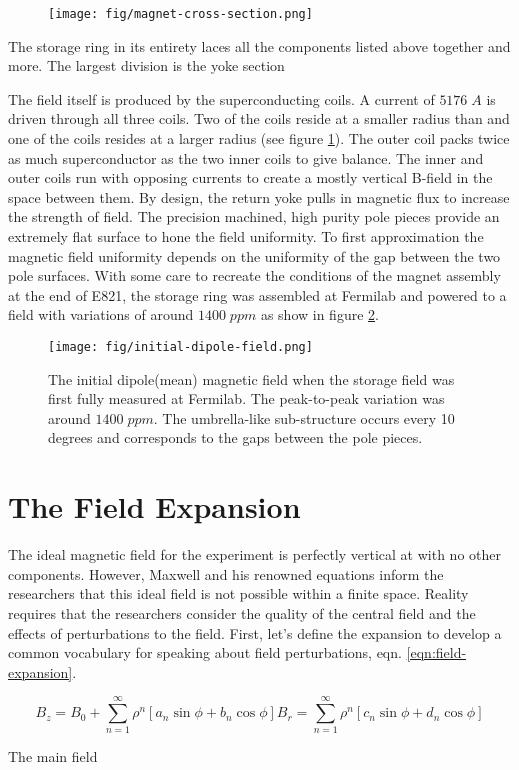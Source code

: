 \begin{figure}
\texttt{[image: fig/magnet-cross-section.png]}
\caption{}
\label{fig:magnet-cross-section}
\end{figure}

The storage ring in its entirety laces all the components listed above together and more.  The largest division is the yoke section

The field itself is produced by the superconducting coils.  A current of $5176\;A$ is driven through all three coils.  Two of the coils reside at a smaller radius than \rmagic and one of the coils resides at a larger radius (see figure \ref{fig:magnet-cross-section}).  The outer coil packs twice as much superconductor as the two inner coils to give balance.  The inner and outer coils run with opposing currents to create a mostly vertical B-field in the space between them.  By design, the return yoke pulls in magnetic flux to increase the strength of field.  The precision machined, high purity pole pieces provide an extremely flat surface to hone the field uniformity.  To first approximation the magnetic field uniformity depends on the uniformity of the gap between the two pole surfaces.  With some care to recreate the  conditions of the magnet assembly at the end of E821, the storage ring was assembled at Fermilab and powered to a field with variations of around $1400\; ppm$ as show in figure \ref{fig:initial-field}.

\begin{figure}
\texttt{[image: fig/initial-dipole-field.png]}
\caption{The initial dipole(mean) magnetic field when the storage field was first fully measured at Fermilab.  The peak-to-peak variation was around $1400\;ppm$.  The umbrella-like sub-structure occurs every 10 degrees and corresponds to the gaps between the pole pieces.}
\label{fig:initial-field}
\end{figure}

\section{The Field Expansion}

The ideal magnetic field for the experiment is perfectly vertical at \bmagic with no other components.  However, Maxwell and his renowned equations inform the researchers that this ideal field is not possible within a finite space.  Reality requires that the researchers consider the quality of the central field and the effects of perturbations to the field.  First, let's define the expansion to develop a common vocabulary for speaking about field perturbations, eqn. \ref{eqn:field-expansion}.

\begin{equation}
B_z = B_0 + \sum_{n=1}^{\infty} \rho^n[a_n \sin{\phi} + b_n \cos{\phi}]
B_r = \sum_{n=1}^{\infty} \rho^n[c_n \sin{\phi} + d_n \cos{\phi}]
\label{eqn:field-expansion}
\end{equation}

The main field






